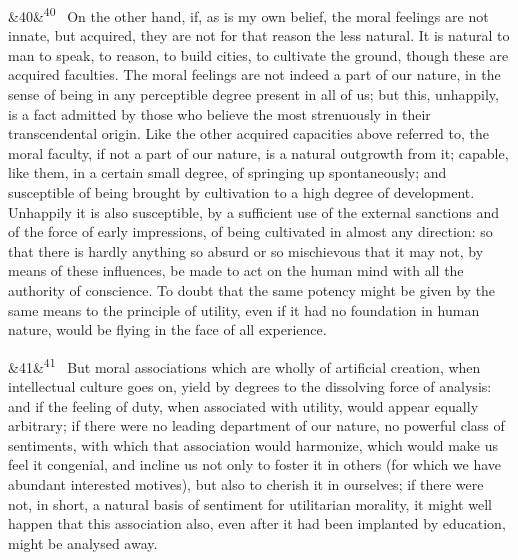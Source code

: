 \documentclass[12pt]{article}
\newcommand{\para}[1][]{\par\noindent\ifx&#1&\else\textsuperscript{\footnotesize #1}~\fi}
\begin{document}
\para[40] On the other hand, if, as is my own belief, the moral feelings are not innate, but acquired, they are not for that reason the less natural. It is natural to man to speak, to reason, to build cities, to cultivate the ground, though these are acquired faculties. The moral feelings are not indeed a part of our nature, in the sense of being in any perceptible degree present in all of us; but this, unhappily, is a fact admitted by those who believe the most strenuously in their transcendental origin. Like the other acquired capacities above referred to, the moral faculty, if not a part of our nature, is a natural outgrowth from it; capable, like them, in a certain small degree, of springing up spontaneously; and susceptible of being brought by cultivation to a high degree of development. Unhappily it is also susceptible, by a sufficient use of the external sanctions and of the force of early impressions, of being cultivated in almost any direction: so that there is hardly anything so absurd or so mischievous that it may not, by means of these influences, be made to act on the human mind with all the authority of conscience. To doubt that the same potency might be given by the same means to the principle of utility, even if it had no foundation in human nature, would be flying in the face of all experience.

\para[41] But moral associations which are wholly of artificial creation, when intellectual culture goes on, yield by degrees to the dissolving force of analysis: and if the feeling of duty, when associated with utility, would appear equally arbitrary; if there were no leading department of our nature, no powerful class of sentiments, with which that association would harmonize, which would make us feel it congenial, and incline us not only to foster it in others (for which we have abundant interested motives), but also to cherish it in ourselves; if there were not, in short, a natural basis of sentiment for utilitarian morality, it might well happen that this association also, even after it had been implanted by education, might be analysed away.
\end{document}
